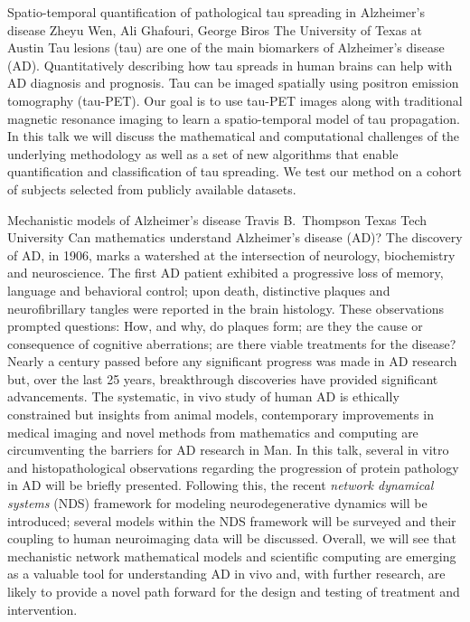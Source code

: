 \begin{addmargin}[2em]{0em}
\vspace{1.5ex}
\abs
{Spatio-temporal quantification of pathological tau spreading in Alzheimer's disease}
{Zheyu Wen, Ali Ghafouri, George Biros}
{The University of Texas at Austin}
{Tau lesions (tau) are one of the main biomarkers of Alzheimer's disease (AD). Quantitatively describing how tau spreads in human brains can help with AD diagnosis and prognosis. Tau can be imaged spatially using positron emission tomography (tau-PET). Our goal is to use tau-PET images along with traditional magnetic resonance imaging to learn a spatio-temporal model of tau propagation. In this talk we will discuss the mathematical and computational challenges of the underlying methodology as well as a set of new algorithms that enable quantification and classification of tau spreading. We test our method on a cohort of subjects selected from publicly available datasets.}


\vspace{1.5ex}
\abs
{Mechanistic models of Alzheimer's disease}
{Travis B.~Thompson}
{Texas Tech University}
{Can mathematics understand Alzheimer's disease (AD)?  The discovery of AD, in 1906, marks a watershed at the intersection of neurology, biochemistry and neuroscience.  The first AD patient exhibited a progressive loss of memory, language and behavioral control; upon death, distinctive plaques and neurofibrillary tangles were reported in the brain histology.  These observations prompted questions: How, and why, do plaques form; are they the cause or consequence of cognitive aberrations; are there viable treatments for the disease? Nearly a century passed before any significant progress was made in AD research but, over the last 25 years, breakthrough discoveries have provided significant advancements. The systematic, in vivo study of human AD is ethically constrained but insights from animal models, contemporary improvements in medical imaging and novel methods from mathematics and computing are circumventing the barriers for AD research in Man. In this talk, several in vitro and histopathological observations regarding the progression of protein pathology in AD will be briefly presented.  Following this, the recent \textit{network dynamical systems} (NDS) framework for modeling neurodegenerative dynamics will be introduced; several models within the NDS framework will be surveyed and their coupling to human neuroimaging data will be discussed.  Overall, we will see that mechanistic network mathematical models and scientific computing are emerging as a valuable tool for understanding AD in vivo and, with further research, are likely to provide a novel path forward for the design and testing of treatment and intervention.}



\end{addmargin}
